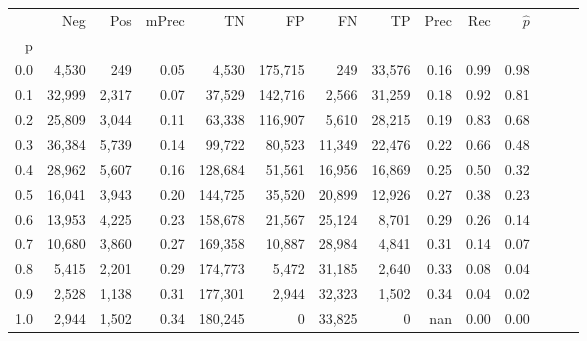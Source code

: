 \begin{tabular}{rrrrrrrrrrrrrr}
\toprule
{} &     Neg &    Pos & mPrec &       TN &       FP &      FN &      TP &  Prec &   Rec & $\hat{p}$ \\
p   &         &        &       &          &          &         &         &       &       &           \\
\midrule
0.0 &   4,530 &    249 &  0.05 &    4,530 &  175,715 &     249 &  33,576 &  0.16 &  0.99 &      0.98 \\
0.1 &  32,999 &  2,317 &  0.07 &   37,529 &  142,716 &   2,566 &  31,259 &  0.18 &  0.92 &      0.81 \\
0.2 &  25,809 &  3,044 &  0.11 &   63,338 &  116,907 &   5,610 &  28,215 &  0.19 &  0.83 &      0.68 \\
0.3 &  36,384 &  5,739 &  0.14 &   99,722 &   80,523 &  11,349 &  22,476 &  0.22 &  0.66 &      0.48 \\
0.4 &  28,962 &  5,607 &  0.16 &  128,684 &   51,561 &  16,956 &  16,869 &  0.25 &  0.50 &      0.32 \\
0.5 &  16,041 &  3,943 &  0.20 &  144,725 &   35,520 &  20,899 &  12,926 &  0.27 &  0.38 &      0.23 \\
0.6 &  13,953 &  4,225 &  0.23 &  158,678 &   21,567 &  25,124 &   8,701 &  0.29 &  0.26 &      0.14 \\
0.7 &  10,680 &  3,860 &  0.27 &  169,358 &   10,887 &  28,984 &   4,841 &  0.31 &  0.14 &      0.07 \\
0.8 &   5,415 &  2,201 &  0.29 &  174,773 &    5,472 &  31,185 &   2,640 &  0.33 &  0.08 &      0.04 \\
0.9 &   2,528 &  1,138 &  0.31 &  177,301 &    2,944 &  32,323 &   1,502 &  0.34 &  0.04 &      0.02 \\
1.0 &   2,944 &  1,502 &  0.34 &  180,245 &        0 &  33,825 &       0 &   nan &  0.00 &      0.00 \\
\bottomrule
\end{tabular}
